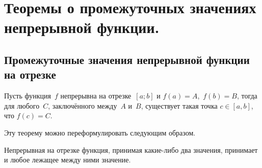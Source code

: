 \chapter{Теоремы о промежуточных значениях непрерывной функции.}
\section{Промежуточные значения непрерывной функции на отрезке}

\begin{thm}  \label{ch3n2}
Пусть функция~$f$ непрерывна на отрезке~$[a;b]$ и $f(a) = A$,~$f(b) = B$, тогда для любого~$C$, заключённого между~$A$ и~$B$, существует такая точка $c \in [a,b]$, что $f(c)=C$.
\end{thm}
Эту теорему можно переформулировать следующим образом.
\begin{thmn} Непрерывная на отрезке функция, принимая какие-либо два значения, принимает и любое лежащее между ними значение. 
\end{thmn}
